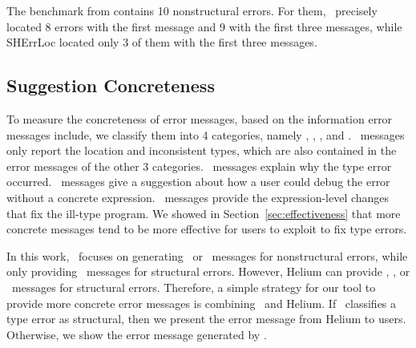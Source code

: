 \documentclass[12pt]{report}	%
\begin{document}
The benchmark from \cite{Chen14:CFT} contains 10 nonstructural errors.
For them, \newCompiler\ precisely located 8 errors with the first message
and 9 with the first three messages, while SHErrLoc located only
3 of them with the first three messages.

\subsection{Suggestion Concreteness}
\label{sec:eval:concreteness}

To measure the concreteness of error messages,
based on the information error messages include,
we classify them into 4 categories,
namely \emph{\location}, \emph{\reason},
\emph{\correct}, and \emph{\concrete}.
\Location\ messages only report
the location and inconsistent types,
which are also contained in the error messages
of the other 3 categories.
\Reason\ messages explain why the type error occurred.
\Correct\ messages give a suggestion about
how a user could debug the error without a concrete expression.
\Concrete\ messages provide the expression-level
changes that fix the ill-type program.
We showed in Section~\ref{sec:effectiveness} that more
concrete messages tend to be more effective for users
to exploit to fix type errors. 

In this work, \newCompiler\ focuses on generating
\correct\ or \concrete\ messages for nonstructural errors,
while only providing \location\ messages for structural errors.
However, Helium can provide \reason, \correct, or \concrete\
messages for structural errors.
Therefore, a simple strategy for our tool to provide
more concrete error messages 
is combining \newCompiler\ and Helium.
If \newCompiler\ classifies a type error as structural,
then we present the error message from Helium to users.
Otherwise, we show the error message generated by \newCompiler.
\end{document}
